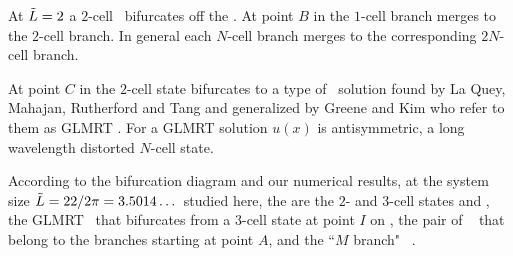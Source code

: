 At $\tilde{L}=2$ a $2$-cell \eqv\ bifurcates off the  \eqv.
At point $B$ in 
the $1$-cell branch merges to the $2$-cell branch.
In general each $N$-cell branch merges to the corresponding $2N$-cell branch.

At point $C$ in 
the $2$-cell state bifurcates to a type of
\eqv\ solution
found by La Quey, Mahajan, Rutherford and Tang 
and generalized by Greene and Kim who refer to them as GLMRT \eqva.
For a GLMRT solution $u(x)$ is antisymmetric,
a long wavelength distorted $N$-cell state.


According to the bifurcation diagram
and our numerical results,
at the system size $\tilde{L}=22/2\pi = 3.5014\dots$
studied here,
the {\eqva} are the $2$- and $3$-cell states  and ,
the GLMRT \eqv\ that bifurcates from a $3$-cell state at point $I$
on ,
the pair of \reqva\  
that belong to the branches starting at point
$A$,
and the ``$M$ branch"  \reqva\ .

